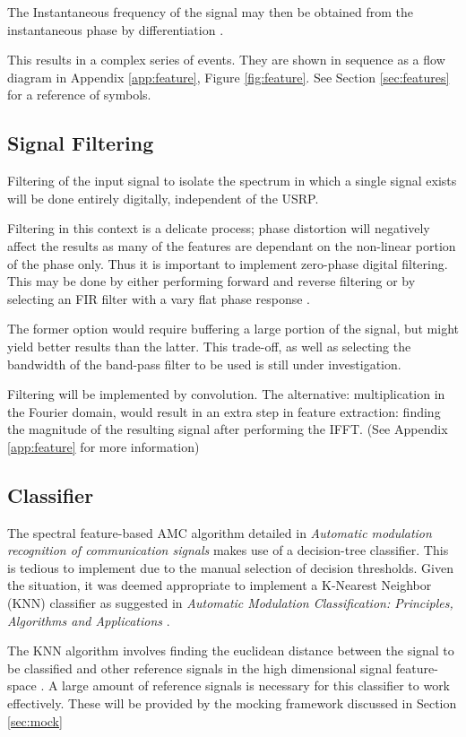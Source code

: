 \documentclass[10pt,twocolumn]{witseiepaper}
\begin{document}
		The Instantaneous frequency of the signal may then be obtained from the instantaneous phase by differentiation \cite{park2009introduction}.

		This results in a complex series of events. They are shown in sequence as a flow diagram in Appendix \ref{app:feature}, Figure \ref{fig:feature}. See Section \ref{sec:features} for a reference of symbols.

	\subsection{Signal Filtering}
		Filtering of the input signal to isolate the spectrum in which a single signal exists will be done entirely digitally, independent of the USRP.

		Filtering in this context is a delicate process; phase distortion will negatively affect the results as many of the features are dependant on the non-linear portion of the phase only. 
		Thus it is important to implement zero-phase digital filtering.
		This may be done by either performing forward and reverse filtering or by selecting an FIR filter with a vary flat phase response \cite{sundararajan2003digital}.

		The former option would require buffering a large portion of the signal, but might yield better results than the latter. This trade-off, as well as selecting the bandwidth of the band-pass filter to be used is still under investigation.

		Filtering will be implemented by convolution. The alternative: multiplication in the Fourier domain, would result in an extra step in feature extraction: finding the magnitude of the resulting signal after performing the IFFT. (See Appendix \ref{app:feature} for more information)

	\subsection{Classifier}
	The spectral feature-based AMC algorithm detailed in \textit{Automatic modulation recognition of communication signals} \cite{azzouz2013automatic} makes use of a decision-tree classifier. 
	This is tedious to implement due to the manual selection of decision thresholds. 
	Given the situation, it was deemed appropriate to implement a K-Nearest Neighbor (KNN) classifier as suggested in \textit{Automatic Modulation Classification: Principles, Algorithms and Applications} \cite{zhu2014automatic}. 

	The KNN algorithm involves finding the euclidean distance between the signal to be classified and other reference signals in the high dimensional signal feature-space \cite{zhu2014automatic}. A large amount of reference signals is necessary for this classifier to work effectively. These will be provided by the mocking framework discussed in Section \ref{sec:mock}
\end{document}
